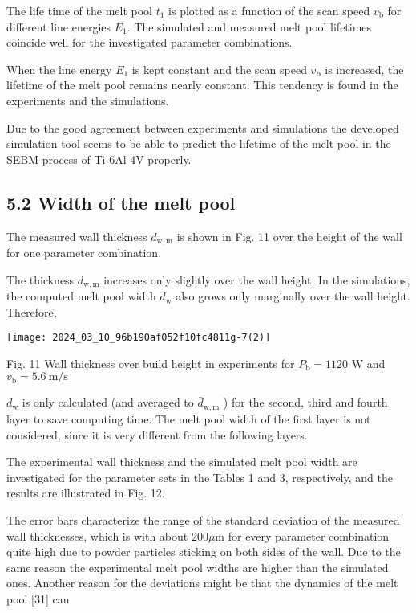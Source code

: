 \documentclass[10pt]{article}
\begin{document}
The life time of the melt pool $t_{1}$ is plotted as a function of the scan speed $v_{\mathrm{b}}$ for different line energies $E_{1}$. The simulated and measured melt pool lifetimes coincide well for the investigated parameter combinations.

When the line energy $E_{1}$ is kept constant and the scan speed $v_{\mathrm{b}}$ is increased, the lifetime of the melt pool remains nearly constant. This tendency is found in the experiments and the simulations.

Due to the good agreement between experiments and simulations the developed simulation tool seems to be able to predict the lifetime of the melt pool in the SEBM process of Ti-6Al-4V properly.

\subsection*{5.2 Width of the melt pool}
The measured wall thickness $d_{\mathrm{w}, \mathrm{m}}$ is shown in Fig. 11 over the height of the wall for one parameter combination.

The thickness $d_{\mathrm{w}, \mathrm{m}}$ increases only slightly over the wall height. In the simulations, the computed melt pool width $d_{\mathrm{w}}$ also grows only marginally over the wall height. Therefore,

\begin{center}
\texttt{[image: 2024\_03\_10\_96b190af052f10fc4811g-7(2)]}
\end{center}

Fig. 11 Wall thickness over build height in experiments for $P_{\mathrm{b}}=1120$ $\mathrm{W}$ and $v_{\mathrm{b}}=5.6 \mathrm{~m} / \mathrm{s}$

$d_{\mathrm{w}}$ is only calculated (and averaged to $\bar{d}_{\mathrm{w}, \mathrm{m}}$ ) for the second, third and fourth layer to save computing time. The melt pool width of the first layer is not considered, since it is very different from the following layers.

The experimental wall thickness and the simulated melt pool width are investigated for the parameter sets in the Tables 1 and 3, respectively, and the results are illustrated in Fig. 12.

The error bars characterize the range of the standard deviation of the measured wall thicknesses, which is with about $200 \mu \mathrm{m}$ for every parameter combination quite high due to powder particles sticking on both sides of the wall. Due to the same reason the experimental melt pool widths are higher than the simulated ones. Another reason for the deviations might be that the dynamics of the melt pool [31] can
\end{document}
